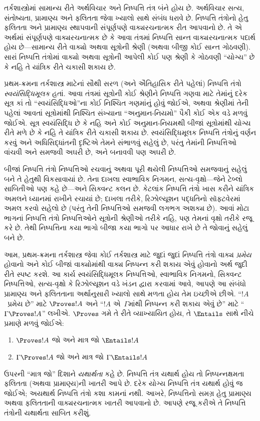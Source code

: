 \label{guunit:OLP-0064}


તર્કશાસ્ત્રોમાં સામાન્ય રીતે અર્થવિચાર અને નિષ્પત્તિ તંત્ર બંને
હોય છે. અર્થવિચાર સત્ય, સંતોષ્યતા, પ્રામાણ્ય અને ફલિતતા જેવા ખ્યાલો
સાથે સંબંધ ધરાવે છે. નિષ્પત્તિ તંત્રોનો હેતુ ફલિતતા અને
પ્રામાણ્ય સ્થાપવાની સંપૂર્ણપણે વાક્યરચનાત્મક રીત આપવાનો છે. તે એ
અર્થમાં સંપૂર્ણપણે વાક્યરચનાત્મક છે કે આવા તંત્રમાં નિષ્પત્તિ
સાન્ત વાક્યરચનાત્મક પદાર્થ હોય છે—સામાન્ય રીતે વાક્યો અથવા
સૂત્રોની શ્રેણી (અથવા બીજી કોઈ સાન્ત ગોઠવણી). સારાં
નિષ્પત્તિ તંત્રોમાં વાક્યો અથવા સૂત્રોની આપેલી કોઈ
પણ શ્રેણી કે ગોઠવણી ``યોગ્ય'' છે કે નહિ તે યાંત્રિક રીતે ચકાસી શકાય છે.

પ્રથમ-ક્રમના તર્કશાસ્ત્ર માટેનાં સૌથી સરળ (અને ઐતિહાસિક રીતે પહેલાં)
નિષ્પત્તિ તંત્રો \emph{સ્વયંસિદ્ધિમૂલક} હતાં. આવા તંત્રમાં
સૂત્રોની કોઈ શ્રેણીને નિષ્પત્તિ ગણવા માટે તેમાંનું દરેક
સૂત્ર કાં તો ``સ્વયંસિદ્ધિઓ''ના કોઈ નિશ્ચિત ગણમાંનું હોવું જોઈએ,
અથવા શ્રેણીમાં તેની પહેલાં આવતાં સૂત્રોમાંથી નિશ્ચિત સંખ્યાના
``અનુમાન-નિયમો'' પૈકી કોઈ એક વડે મળવું જોઈએ. સૂત્ર
સ્વયંસિદ્ધિ છે કે નહિ અને કોઈ અનુમાન-નિયમથી બીજાં સૂત્રોમાંથી
યોગ્ય રીતે મળે છે કે નહિ તે યાંત્રિક રીતે ચકાસી શકાય છે.
સ્વયંસિદ્ધિમૂલક નિષ્પત્તિ તંત્રોનું વર્ણન કરવું અને
અધિસિદ્ધાંતની દૃષ્ટિએ તેમને સંભાળવું સહેલું છે, પરંતુ તેમાંની
નિષ્પત્તિઓ વાંચવી અને સમજવી અઘરી છે, અને બનાવવી પણ અઘરી છે.

બીજાં નિષ્પત્તિ તંત્રો નિષ્પત્તિઓ રચવાનું અથવા પૂરી થયેલી
નિષ્પત્તિઓ સમજવાનું સહેલું બને તે હેતુથી વિકસાવાયાં છે. તેના
દાખલા સ્વાભાવિક નિગમન, સત્ય-વૃક્ષો—જેને ટેબ્લો સાબિતીઓ પણ કહે
છે—અને સિક્વન્ટ કલન છે. કેટલાંક નિષ્પત્તિ તંત્રો ખાસ કરીને
યાંત્રિક અમલને ધ્યાનમાં રાખીને રચાયાં છે; દાખલા તરીકે, રિઝોલ્યૂશન
પદ્ધતિનો સૉફ્ટવેરમાં અમલ કરવો સહેલો છે (પરંતુ તેની નિષ્પત્તિઓ
સમજવી લગભગ અશક્ય છે). આવાં મોટા ભાગનાં નિષ્પત્તિ તંત્રો
નિષ્પત્તિઓને સૂત્રોની
શ્રેણીઓ તરીકે નહિ, પણ તેમનાં વૃક્ષો તરીકે રજૂ કરે છે.
તેથી નિષ્પત્તિના કયા ભાગો બીજા કયા ભાગો પર આધાર રાખે છે તે
જોવાનું સહેલું બને છે.

આમ, પ્રથમ-ક્રમના તર્કશાસ્ત્ર જેવા કોઈ તર્કશાસ્ત્ર માટે જુદાં જુદાં
નિષ્પત્તિ તંત્રો વાક્ય \emph{પ્રમેય} હોવાનો અને કોઈ
બીજાં વાક્યોમાંથી વાક્ય નિષ્પન્ન કરી શકાય એવું હોવાનો અર્થ જુદી
રીતે સ્પષ્ટ કરશે. આ કાર્ય સ્વયંસિદ્ધિમૂલક નિષ્પત્તિઓ, સ્વાભાવિક
નિગમનો, સિક્વન્ટ નિષ્પત્તિઓ, સત્ય-વૃક્ષો કે રિઝોલ્યૂશન વડે ખંડન
દ્વારા કરવામાં આવે, આપણે આ સંબંધો પ્રામાણ્ય અને ફલિતતાના અર્થાનુસારી
ખ્યાલો સાથે મળતા હોય તેમ ઇચ્છીએ છીએ. ``$!A$~પ્રમેય છે'' માટે
$\Proves !A$ અને ``$!A$ એ~$\Gamma$માંથી નિષ્પન્ન કરી શકાય એવું છે'' માટે
``$\Gamma \Proves !A$'' લખીએ. $\Proves$ ગમે તે રીતે વ્યાખ્યાયિત હોય,
તે $\Entails$ સાથે નીચે પ્રમાણે મળવું જોઈએ:
\begin{enumerate}
\item $\Proves !A$ જો અને માત્ર જો $\Entails !A$
\item $\Gamma \Proves !A$ જો અને માત્ર જો $\Gamma \Entails !A$
\end{enumerate}
ઉપરની ``માત્ર જો'' દિશાને \emph{યથાર્થતા} કહે છે. નિષ્પત્તિ
તંત્ર યથાર્થ હોય તો નિષ્પન્નક્ષમતા ફલિતતા (અથવા પ્રામાણ્ય)ની ખાતરી
આપે છે. દરેક યોગ્ય નિષ્પત્તિ તંત્ર યથાર્થ હોવું જ જોઈએ;
અયથાર્થ નિષ્પત્તિ તંત્રો કશા કામનાં નથી. આખરે,
નિષ્પત્તિનો સમગ્ર હેતુ
પ્રામાણ્ય અથવા ફલિતતાની વાક્યરચનાત્મક ખાતરી આપવાનો છે. આપણે રજૂ
કરીએ તે નિષ્પત્તિ તંત્રોની યથાર્થતા સાબિત કરીશું.

